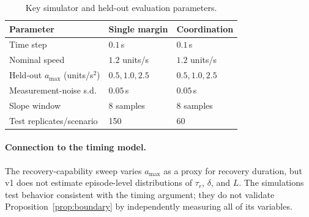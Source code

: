 \begin{table}[tbp]
\centering
\caption{Key simulator and held-out evaluation parameters.}
\label{tab:parameters}
\begin{tabular}{lll}
\toprule
Parameter & Single margin & Coordination \\
\midrule
Time step & $0.1$\,s & $0.1$\,s \\
Nominal speed & $1.2$ units/s & $1.2$ units/s \\
Held-out $a_{\max}$ (units/s$^2$) & $0.5,1.0,2.5$ & $0.5,1.0,2.5$ \\
Measurement-noise s.d. & $0.05$\,s & $0.05$\,s \\
Slope window & 8 samples & 8 samples \\
Test replicates/scenario & 150 & 60 \\
\bottomrule
\end{tabular}
\end{table}

\paragraph{Connection to the timing model.}
The recovery-capability sweep varies $a_{\max}$ as a proxy for recovery duration, but v1 does not estimate episode-level distributions of $\tau_r$, $\delta$, and $L$. The simulations test behavior consistent with the timing argument; they do not validate Proposition~\ref{prop:boundary} by independently measuring all of its variables.
